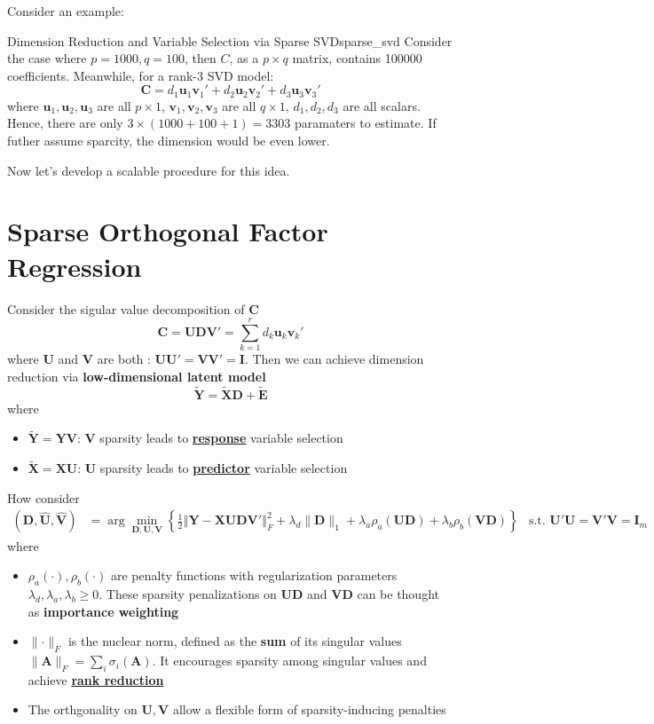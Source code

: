 \documentclass[twoside]{article}
\begin{document}
Consider an example:
\begin{example}{Dimension Reduction and Variable Selection via Sparse SVD}{sparse_svd}
    Consider the case where $p=1000,q=100$, then $C$, as a $p\times q$ matrix, contains 100000 coefficients. Meanwhile, for a rank-3 SVD model:
    $$
     \mathbf{C} = d_1\mathbf{u}_1\mathbf{v}_1' + d_2\mathbf{u}_2\mathbf{v}_2' + d_3\mathbf{u}_3\mathbf{v}_3'
    $$
    where $\mathbf{u}_1,\mathbf{u}_2,\mathbf{u}_3$ are all $p\times 1$, $\mathbf{v}_1,\mathbf{v}_2,\mathbf{v}_3$ are all $q\times 1$, $d_1,d_2,d_3$ are all scalars. Hence, there are only $3\times (1000+100+1) = 3303$ paramaters to estimate. If futher assume sparcity, the dimension would be even lower.
\end{example}
Now let's develop a scalable procedure for this idea.

\section{Sparse Orthogonal Factor Regression}
Consider the sigular value decomposition of $\mathbf{C}$
$$
\mathbf{C} = \mathbf{UDV}'=\sum^r_{k=1}d_k\mathbf{u}_k\mathbf{v}_k'
$$
where $\mathbf{U}$ and $\mathbf{V}$ are both : $\mathbf{UU}' = \mathbf{VV}'=\mathbf{I}$. Then we can achieve dimension reduction via \textbf{low-dimensional latent model} $$ \tilde{\mathbf{Y}} = \tilde{\mathbf{X}}\mathbf{D}+\tilde{\mathbf{E}} $$ where 
\begin{itemize}
    \item $\tilde{\mathbf{Y}} = \mathbf{YV}$: $\mathbf{V}$ sparsity leads to \textbf{\underline{response}} variable selection
    \item $\tilde{\mathbf{X}} = \mathbf{XU}$: $\mathbf{U}$ sparsity leads to \textbf{\underline{predictor}} variable selection
\end{itemize}

How consider 
\begin{align}
    \left( \hat{\mathbf{D}},\hat{\mathbf{U}},\hat{\mathbf{V}} \right) &= \arg\min_{\mathbf{D,U,V}}\left\{ \frac{1}{2}\left\Vert \mathbf{Y-XUDV}' \right\Vert _F^2 + \lambda_d \lVert \mathbf{D} \rVert _1 + \lambda_a \rho_a (\mathbf{UD}) + \lambda_b \rho_b (\mathbf{VD})\right\} & \text{s.t. } \mathbf{U'U}=\mathbf{V'V}=\mathbf{I}_m 
\end{align}
where 
\begin{itemize}
    \item $\rho_a(\cdot),\rho_b(\cdot)$ are penalty functions with regularization parameters $\lambda_d,\lambda_a,\lambda_b\geq 0$. These sparsity penalizations on $\mathbf{UD}$ and $\mathbf{VD}$ can be thought as \textbf{importance weighting}
    \item $\lVert \cdot \rVert _F$ is the nuclear norm, defined as the \textbf{sum} of its singular values $\lVert \mathbf{A}\rVert _F =\sum_i\sigma_i(\mathbf{A})$. It encourages sparsity among singular values and achieve \textbf{\underline{rank reduction}}
    \item The orthgonality on $\mathbf{U,V}$ allow a flexible form of sparsity-inducing penalties
\end{itemize}
\end{document}
